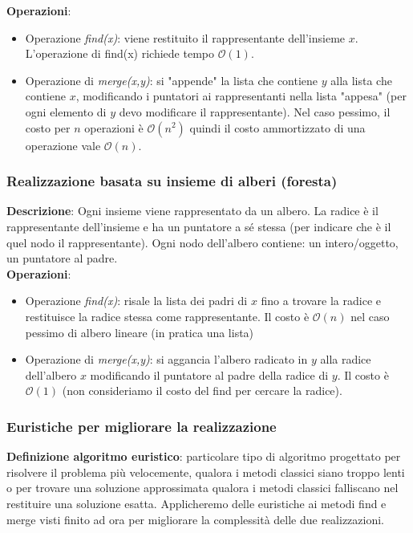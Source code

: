 \documentclass[../cheatSheetAlgoritmi.tex]{subfiles}
\begin{document}
\bigskip

\textbf{Operazioni}:
\begin{itemize}
	\item Operazione \emph{find(x)}: viene restituito il rappresentante dell'insieme $x$. L'operazione di find(x) richiede tempo $\mathcal{O}(1)$.
	\item Operazione di \emph{merge(x,y)}: si "appende" la lista che contiene $y$ alla lista che contiene $x$, modificando i puntatori ai rappresentanti nella lista "appesa" (per ogni elemento di $y$ devo modificare il rappresentante). Nel caso pessimo, il costo per $n$ operazioni è $\mathcal{O}(n^{2})$ quindi il costo ammortizzato di una operazione vale $\mathcal{O}(n)$. 
\end{itemize}
\subsubsection{Realizzazione basata su insieme di alberi (foresta)}
\textbf{Descrizione}: Ogni insieme viene rappresentato da un albero. La radice è il rappresentante dell'insieme e ha un puntatore a sé stessa (per indicare che è il quel nodo il rappresentante). Ogni nodo dell'albero contiene: un intero/oggetto, un puntatore al padre.\\
\textbf{Operazioni}:
\begin{itemize}
	\item Operazione \emph{find(x)}: risale la lista dei padri di $x$ fino a trovare la radice e restituisce la radice stessa come rappresentante. Il costo è $\mathcal{O}(n)$ nel caso pessimo di albero lineare (in pratica una lista)
	\item Operazione di \emph{merge(x,y)}: si aggancia l'albero radicato in $y$ alla radice dell'albero $x$ modificando il puntatore al padre della radice di $y$. Il costo è $\mathcal{O}(1)$ (non consideriamo il costo del find per cercare la radice).  
\end{itemize}
\subsubsection{Euristiche per migliorare la realizzazione}
\textbf{Definizione algoritmo euristico}: particolare tipo di algoritmo progettato per risolvere il problema più velocemente, qualora i metodi classici siano troppo lenti o per trovare una soluzione approssimata qualora i metodi classici falliscano nel restituire una soluzione esatta. Applicheremo delle euristiche ai metodi find e merge visti finito ad ora per migliorare la complessità delle due realizzazioni. 
\end{document}
